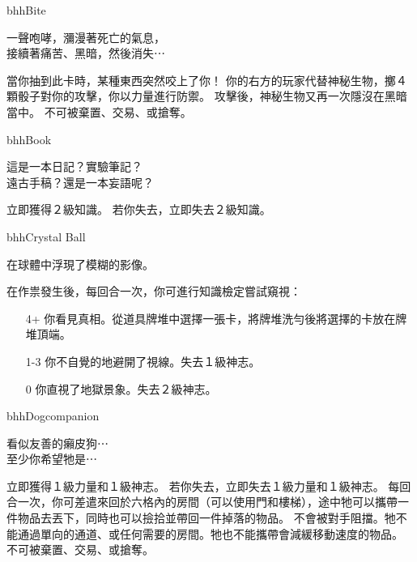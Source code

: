 %
\begin{OmenCard}{bhh}{Bite}{}
  \begin{CardStory}
    一聲咆哮，瀰漫著死亡的氣息，\\
    接續著痛苦、黑暗，然後消失⋯
  \end{CardStory}
  當你抽到此卡時，某種東西突然咬上了你！\smallbreak
  你的右方的玩家代替神秘生物，擲４顆骰子對你的攻擊，你以力量進行防禦。\smallbreak
  攻擊後，神秘生物又再一次隱沒在黑暗當中。\smallbreak
  \ThisName{}不可被棄置、交易、或搶奪。\smallbreak
\end{OmenCard}%
\linebreak[0]%
\begin{OmenCard}{bhh}{Book}{}
  \begin{CardStory}
    這是一本日記？實驗筆記？\\
    遠古手稿？還是一本妄語呢？
  \end{CardStory}
  立即獲得２級知識。\smallbreak
  若你失去\ThisName{}，立即失去２級知識。\smallbreak
\end{OmenCard}%
\linebreak[0]%
\begin{OmenCard}{bhh}{Crystal Ball}{}
  \begin{CardStory}
    在球體中浮現了模糊的影像。
  \end{CardStory}
  在作祟發生後，每回合一次，你可進行知識檢定嘗試窺視\ThisName{}：
  \begin{itemize}
    \item[4+] 你看見真相。從道具牌堆中選擇一張卡，將牌堆洗勻後將選擇的卡放在牌堆頂端。
    \item[1-3] 你不自覺的地避開了視線。失去１級神志。
    \item[0] 你直視了地獄景象。失去２級神志。
  \end{itemize}
\end{OmenCard}%
\linebreak[0]%
\begin{OmenCard}{bhh}{Dog}{companion}
  \begin{CardStory}
    看似友善的癩皮狗⋯\\
    至少你希望牠是⋯
  \end{CardStory}
  立即獲得１級力量和１級神志。\smallbreak
  若你失去\ThisName{}，立即失去１級力量和１級神志。\smallbreak
  每回合一次，你可差遣\ThisName{}來回於六格內的房間（可以使用門和樓梯），途中牠可以攜帶一件物品去丟下，同時也可以撿拾並帶回一件掉落的物品。\smallbreak
  \ThisName{}不會被對手阻擋。牠不能通過單向的通道、或任何需要\RollAny{}的房間。牠也不能攜帶會減緩移動速度的物品。\smallbreak
  \ThisName{}不可被棄置、交易、或搶奪。\smallbreak
\end{OmenCard}%

